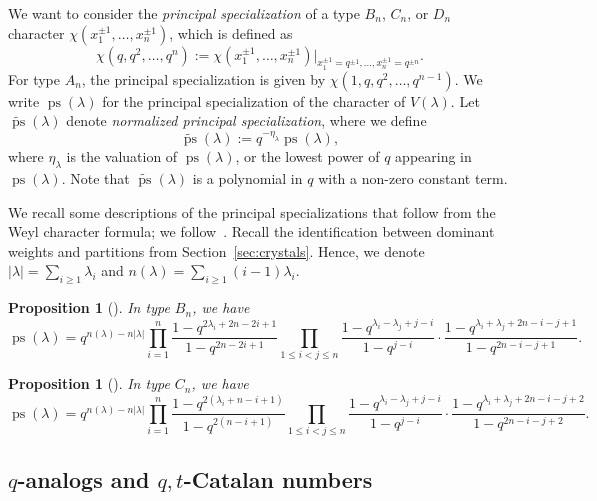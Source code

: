 \documentclass[11pt, leqno]{amsart}
\theoremstyle{plain}
\newtheorem{proposition}[theorem]{Proposition}
\theoremstyle{definition}
\numberwithin{equation}{section}
\newcommand{\seteq}{\mathbin{:=}}
\newcommand{\ps}{\operatorname{ps}} %
\newcommand{\nps}{\widetilde{\ps}} %
\newcommand{\defn}[1]{{\color{darkred}\emph{#1}}} %
\begin{document}
We want to consider the \defn{principal specialization} of a type $B_n$, $C_n$, or $D_n$ character $\chi(x_1^{\pm 1}, \dotsc, x_n^{\pm 1})$, which is defined as
\[
\chi(q, q^2, \dotsc, q^n) \seteq \chi(x_1^{\pm 1}, \dotsc, x_n^{\pm 1}) \bigr|_{x_1^{\pm 1}=q^{\pm 1},\ldots,x_n^{\pm 1}=q^{\pm n}}.
\]
For type $A_n$, the principal specialization is given by $\chi(1,q,q^2,\dotsc,q^{n-1})$.
We write $\ps(\lambda)$ for the principal specialization of the character of $V(\lambda)$.
Let $\nps(\lambda)$ denote \defn{normalized principal specialization}, where we define
\[
\nps(\lambda) \seteq q^{-\eta_{\lambda}} \ps(\lambda),
\]
where $\eta_{\lambda}$ is the valuation of $\ps(\lambda)$, or the lowest power of $q$ appearing in $\ps(\lambda)$.
Note that $\nps(\lambda)$ is a polynomial in $q$ with a non-zero constant term.

We recall some descriptions of the principal specializations that follow from the Weyl character formula; we follow~\cite{BKW16}. Recall the identification between dominant weights and partitions from Section~\ref{sec:crystals}. Hence, we denote $|\lambda| = \sum_{i \geq 1} \lambda_i$ and $n(\lambda) = \sum_{i \geq 1} (i-1)\lambda_i$.

\begin{proposition}[{\cite[Eq.~(3.21)]{BKW16}}]
\label{prop:Bn_ps}
In type $B_n$, we have
\[
\ps(\lambda) = q^{n(\lambda) - n|\lambda|} \prod_{i=1}^n \dfrac{1-q^{2\lambda_i+2n-2i+1}}{1-q^{2n-2i+1}} \prod_{1 \leq i < j \leq n} \dfrac{1-q^{\lambda_i-\lambda_j+j-i}}{1-q^{j-i}} \cdot \dfrac{1-q^{\lambda_i+\lambda_j+2n-i-j+1}}{1-q^{2n-i-j+1}}.
\]
\end{proposition}

\begin{proposition}[{\cite[Eq.~(3.30a)]{BKW16}}]
\label{prop:Cn_ps}
In type $C_n$, we have
\[
\ps(\lambda) = q^{n(\lambda) - n|\lambda|} \prod_{i=1}^n \dfrac{1-q^{2(\lambda_i+n-i+1)}}{1-q^{2(n-i+1)}} \prod_{1 \leq i < j \leq n} \dfrac{1-q^{\lambda_i-\lambda_j+j-i}}{1-q^{j-i}} \cdot \dfrac{1-q^{\lambda_i+\lambda_j+2n-i-j+2}}{1-q^{2n-i-j+2}}.
\]
\end{proposition}


\subsection{$q$-analogs and $q,t$-Catalan numbers}
\end{document}
